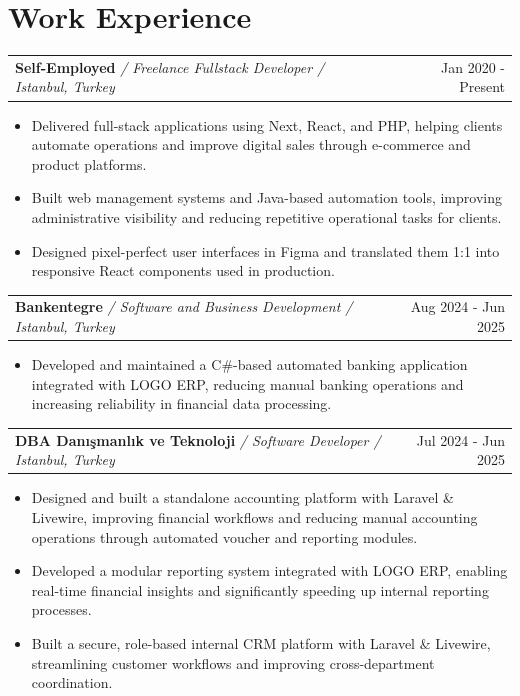 \documentclass[a4paper,12pt]{article}
\makeatletter
\newenvironment{joblong}[4]
    {
    \begin{tabularx}{\linewidth}{@{}l X r@{}}
    \textbf{#1} {\small\textit{/ #2 / #4} } & \hfill & #3 \\[3.5pt]
    \end{tabularx}
    \vspace{3.5pt}
    \begin{minipage}[t]{\linewidth}
    \begin{itemize}[nosep,after=\strut, leftmargin=1.5em, itemsep=4pt,label=--]
    }
    {
    \end{itemize}
    \end{minipage}
    \vspace{-6pt}
    }
\makeatother
\begin{document}
\section{Work Experience}

\begin{joblong}{Self-Employed}{Freelance Fullstack Developer}{Jan 2020 - Present}{Istanbul, Turkey}
\item Delivered full-stack applications using Next, React, and PHP, helping clients automate operations and improve digital sales through e-commerce and product platforms.
\item Built web management systems and Java-based automation tools, improving administrative visibility and reducing repetitive operational tasks for clients.
\item Designed pixel-perfect user interfaces in Figma and translated them 1:1 into responsive React components used in production.
\end{joblong}

\begin{joblong}{Bankentegre}{Software and Business Development}{Aug 2024 - Jun 2025}{Istanbul, Turkey}
\item Developed and maintained a C\#-based automated banking application integrated with LOGO ERP, reducing manual banking operations and increasing reliability in financial data processing.
\vspace{-2pt}
\end{joblong}

\begin{joblong}{DBA Danışmanlık ve Teknoloji}{Software Developer}{Jul 2024 - Jun 2025}{Istanbul, Turkey}
\item Designed and built a standalone accounting platform with Laravel \& Livewire, improving financial workflows and reducing manual accounting operations through automated voucher and reporting modules.
\item Developed a modular reporting system integrated with LOGO ERP, enabling real-time financial insights and significantly speeding up internal reporting processes.
\item Built a secure, role-based internal CRM platform with Laravel \& Livewire, streamlining customer workflows and improving cross-department coordination.
\end{joblong}
\vspace{-8pt}
\end{document}
